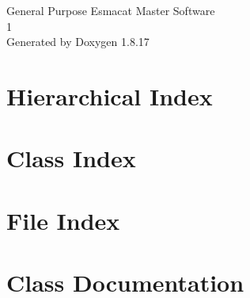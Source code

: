 \let\mypdfximage\pdfximage\def\pdfximage{\immediate\mypdfximage}\documentclass[twoside]{book}
\newcommand{\+}{\discretionary{\mbox{\scriptsize$\hookleftarrow$}}{}{}}
\newcommand{\clearemptydoublepage}{%
  \newpage{\pagestyle{empty}\cleardoublepage}%
}
\begin{document}
\hypersetup{pageanchor=false,
             bookmarksnumbered=true,
             pdfencoding=unicode
            }
\begin{titlepage}
\vspace*{7cm}
\begin{center}%
{\Large General Purpose Esmacat Master Software \\[1ex]\large 1 }\\
\vspace*{1cm}
{\large Generated by Doxygen 1.8.17}\\
\end{center}
\end{titlepage}
\clearemptydoublepage
{}
\tableofcontents
\clearemptydoublepage
{}
\hypersetup{pageanchor=true}

\chapter{Hierarchical Index}

\chapter{Class Index}

\chapter{File Index}

\chapter{Class Documentation}












\end{document}

